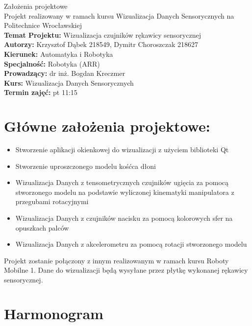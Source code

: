 \documentclass[12pt,a4paper]{article}
\begin{document}
\LARGE\centering Założenia projektowe\\
\large\centering Projekt realizowany w ramach kursu Wizualizacja Danych Sensorycznych na Politechnice Wrocławskiej\\
\vspace{5 mm}
\normalsize\flushleft\textbf{Temat Projektu:} Wizualizacja czujników rękawicy sensorycznej\\
\textbf{Autorzy:} Krzysztof Dąbek 218549, Dymitr Choroszczak 218627\\
\textbf{Kierunek:} Automatyka i Robotyka\\
\textbf{Specjalność:} Robotyka (ARR)\\
\textbf{Prowadzący:} dr inż. Bogdan Kreczmer\\
\textbf{Kurs:} Wizualizacja Danych Sensorycznych\\
\textbf{Termin zajęć:} pt 11:15\\
\vspace{5 mm}

\section{Główne założenia projektowe:}
\begin{itemize}
\item Stworzenie aplikacji okienkowej do wizualizacji z użyciem biblioteki Qt
\item Stworzenie uproszczonego modelu kośćca dłoni
\item Wizualizacja Danych z tensometrycznych czujników ugięcia za pomocą stworzonego modelu na podstawie wyliczonej kinematyki manipulatora z przegubami rotacyjnymi
\item Wizualizacja Danych z czujników nacisku za pomocą kolorowych sfer na opuszkach palców
\item Wizualizacja Danych z akcelerometru za pomocą rotacji stworzonego modelu
\end{itemize}
Projekt zostanie połączony z innym realizowanym w ramach kursu Roboty Mobilne 1. Dane do wizualizacji będą wysyłane przez płytkę wykonanej rękawicy sensorycznej.

\section{Harmonogram}
\end{document}
